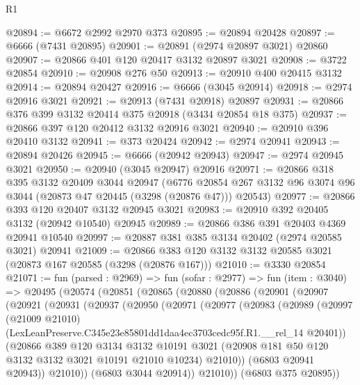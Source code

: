 \begin{lexlean}{R1}
\begin{coremodule}
@20894 := @6672 @2992 @2970 @373
@20895 := @20894 @20428
@20897 := @6666 (@7431 @20895)
@20901 := @20891 (@2974 @20897 @3021) @20860
@20907 := @20866 @401 @120 @20417 @3132 @20897 @3021
@20908 := @3722 @20854
@20910 := @20908 @276 @50
@20913 := @20910 @400 @20415 @3132
@20914 := @20894 @20427
@20916 := @6666 (@3045 @20914)
@20918 := @2974 @20916 @3021
@20921 := @20913 (@7431 @20918) @20897
@20931 := @20866 @376 @399 @3132 @20414 @375 @20918 (@3434 @20854 @18 @375)
@20937 := @20866 @397 @120 @20412 @3132 @20916 @3021
@20940 := @20910 @396 @20410 @3132
@20941 := @373 @20424
@20942 := @2974 @20941
@20943 := @20894 @20426
@20945 := @6666 (@20942 @20943)
@20947 := @2974 @20945 @3021
@20950 := @20940 (@3045 @20947) @20916
@20971 := @20866
    @318
    @395
    @3132
    @20409
    @3044
    @20947
    (@6776 @20854 @267 @3132 @96 @3074 @96 @3044 (@20873 @47 @20445 (@3298 (@20876 @47))) @20543)
@20977 := @20866 @393 @120 @20407 @3132 @20945 @3021
@20983 := @20910 @392 @20405 @3132 (@20942 @10540) @20945
@20989 := @20866 @386 @391 @20403 @4369 @20941 @10540
@20997 := @20887 @381 @385 @3134 @20402 (@2974 @20585 @3021) @20941
@21009 := @20866 @383 @120 @3132 @3132 @20585 @3021 (@20873 @167 @20585 (@3298 (@20876 @167)))
@21010 := @3330 @20854
@21071 := fun (parsed : @2969) =>
  fun (sofar : @2977) =>
  fun (item : @3040) =>
  @20495
    (@20574
      (@20851
        (@20865
          (@20880
            (@20886
              (@20901
                (@20907
                  (@20921
                    (@20931
                      (@20937
                        (@20950
                          (@20971
                            (@20977
                              (@20983
                                (@20989
                                  (@20997
                                    (@21009 @21010)
                                    (LexLeanPreserve.C345e23e85801dd1daa4ec3703cedc95f.R1.__rel_14
                                      @20401))
                                  (@20866
                                    @389
                                    @120
                                    @3134
                                    @3132
                                    @10191
                                    @3021
                                    (@20908 @181 @50 @120 @3132 @3132 @3021 @10191 @21010 @10234)
                                    @21010))
                                (@6803 @20941 @20943))
                              @21010))
                          (@6803 @3044 @20914))
                        @21010))
                    (@6803 @375 @20895))

\end{coremodule}
\end{lexlean}
